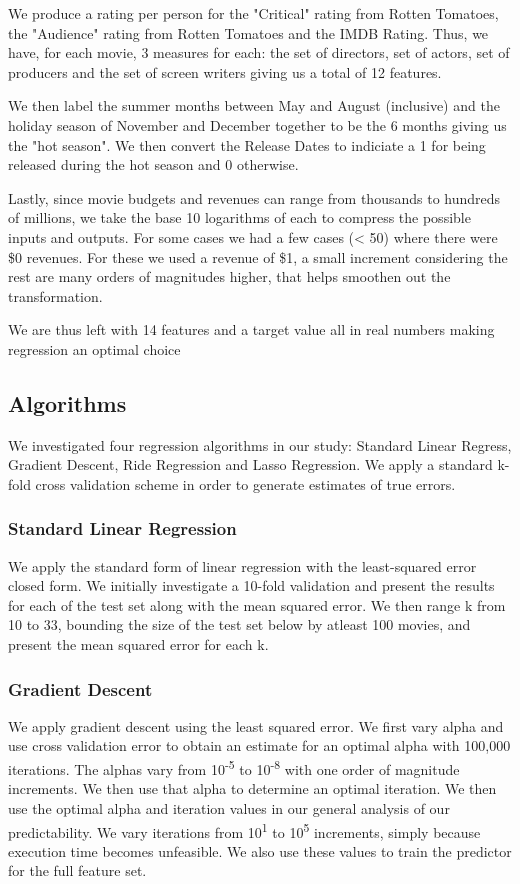 \documentclass[conference]{IEEEtran}
\begin{document}
We produce a rating per person for the "Critical" rating from Rotten Tomatoes, the "Audience" 
rating from Rotten Tomatoes and the IMDB Rating. Thus, we have, for each movie, 
3 measures for each: the set of directors, set of actors, set of producers and 
the set of screen writers giving us a total of 12 features. 

We then label the summer months between May and August (inclusive) and the 
holiday season of November and December together to be the 6 months giving
us the "hot season". We then convert the Release Dates to indiciate a 1 
for being released during the hot season and 0 otherwise. 

Lastly, since movie budgets and revenues can range from thousands
to hundreds of millions, we take the base 10 logarithms of each to
compress the possible inputs and outputs. For some cases we had a 
few cases (< 50) where there were \$0 revenues. For these we used a 
revenue of \$1, a small increment considering the rest are many orders
of magnitudes higher, that helps smoothen out the transformation.

We are thus left with 14 features and a target value all in real numbers making 
regression an optimal choice

\subsection{Algorithms}
We investigated four regression algorithms in our study: 
Standard Linear Regress, Gradient Descent, Ride Regression and 
Lasso Regression. We apply a standard k-fold cross validation 
scheme in order to generate estimates of true errors.

\subsubsection{Standard Linear Regression}
We apply the standard form of linear regression with the least-squared error 
closed form. We initially investigate a 10-fold validation and present the results
for each of the test set along with the mean squared error. We then 
range k from 10 to 33, bounding the size of the test set below by atleast 100 movies, 
and present the mean squared error for each k. 

\subsubsection{Gradient Descent}
We apply gradient descent using the least squared error. We first vary alpha and 
use cross validation error to obtain an estimate for an optimal alpha with 100,000 iterations.
The alphas vary from 10\textsuperscript{-5} to 10\textsuperscript{-8} with one order of magnitude increments. 
We then use that alpha to determine an optimal iteration. We then use the optimal alpha
and iteration values in our general analysis of our predictability. We vary iterations from
10\textsuperscript{1} to 10\textsuperscript{5} increments, simply because execution time becomes unfeasible.
We also use these values to train the predictor for the full feature set.
\end{document}

